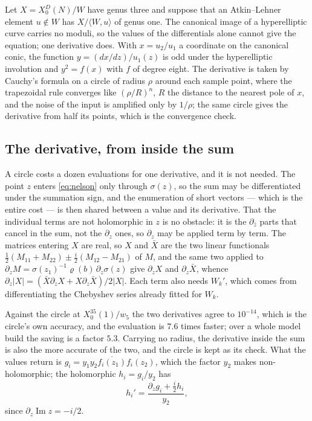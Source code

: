 \documentclass[11pt,reqno]{amsart}
\theoremstyle{plain}
\theoremstyle{definition}
\begin{document}
Let $X=X_0^D(N)/W$ have genus three and suppose that an Atkin--Lehner element $u\notin W$ has
$X/\langle W,u\rangle$ of genus one. The canonical image of a hyperelliptic curve carries no
moduli, so the values of the differentials alone cannot give the equation; one derivative does.
With $x=u_2/u_1$ a coordinate on the canonical conic, the function $y=(dx/dz)/u_1(z)$ is odd
under the hyperelliptic involution and $y^2=f(x)$ with $f$ of degree eight. The derivative is
taken by Cauchy's formula on a circle of radius $\rho$ around each sample point, where the
trapezoidal rule converges like $(\rho/R)^n$, $R$ the distance to the nearest pole of $x$, and the
noise of the input is amplified only by $1/\rho$; the same circle gives the derivative from half
its points, which is the convergence check.

\subsection*{The derivative, from inside the sum}
A circle costs a dozen evaluations for one derivative, and it is not needed. The point $z$ enters
\eqref{eq:nelson} only through $\sigma(z)$, so the sum may be differentiated under the summation
sign, and the enumeration of short vectors --- which is the entire cost --- is then shared between
a value and its derivative. That the individual terms are not holomorphic in $z$ is no obstacle:
it is the $\partial_{\bar z}$ parts that cancel in the sum, not the $\partial_z$ ones, so
$\partial_z$ may be applied term by term. The matrices entering $X$ are real, so $X$ and $\bar X$
are the two linear functionals $\tfrac12(M_{11}+M_{22})\pm\tfrac{i}{2}(M_{12}-M_{21})$ of $M$, and
the same two applied to $\partial_z M=\sigma(z_1)^{-1}\varrho(b)\,\partial_z\sigma(z)$ give
$\partial_zX$ and $\partial_z\bar X$, whence
$\partial_z|X|=(\bar X\partial_zX+X\partial_z\bar X)/2|X|$. Each term also needs $W_k'$, which
comes from differentiating the Chebyshev series already fitted for $W_k$.

Against the circle at $X_0^{35}(1)/w_5$ the two derivatives agree to $10^{-14}$, which is the
circle's own accuracy, and the evaluation is $7.6$ times faster; over a whole model build the
saving is a factor $5.3$. Carrying no radius, the derivative inside the sum is also the more
accurate of the two, and the circle is kept as its check. What the values return is
$g_i=y_1y_2\overline{f_i(z_1)}f_i(z_2)$, which the factor $y_2$ makes non-holomorphic; the
holomorphic $h_i=g_i/y_2$ has
\[
  h_i'=\frac{\partial_zg_i+\tfrac{i}{2}h_i}{y_2},
\]
since $\partial_z\operatorname{Im}z=-i/2$.
\end{document}
